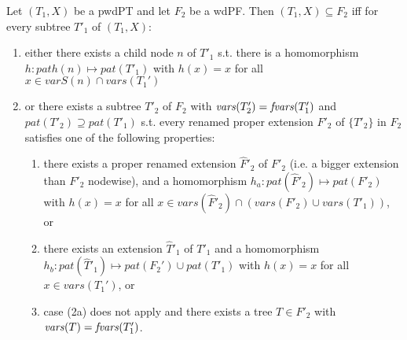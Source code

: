\begin{theorem}\label{projwd3}
	Let $(T_1,X)$ be a pwdPT and let $F_2$ be a wdPF. Then $(T_1,X) \subseteq
	F_2$ iff for every subtree $T'_1$ of $(T_1,X)$:
	\begin{enumerate}
		\item either there exists a child node $n$ of $T'_1$ s.t. there is a
			homomorphism $h: path(n) \mapsto pat(T'_1)$ with $h(x) = x$ for
			all $x \in varS(n) \cap vars(T_1')$
		\item or there exists a subtree $T'_2$ of $F_2$ with $\mathit{vars}(T'_2) =
			\mathit{fvars}(T_1')$ and $pat(T'_2) \supseteq pat(T'_1)$ s.t. every
			renamed proper extension $F'_2$ of $\{T'_2\}$ in $F_2$ satisfies one
			of the following properties:
			\begin{enumerate}
				\item \label{firstcaseprojwd3}there exists a proper renamed extension $\hat{F}'_2$ of
					$F'_2$ (i.e. a bigger extension than $F'_2$ nodewise),
					and a homomorphism $h_a: pat(\hat{F}'_2) \mapsto
					pat(F'_2)$ with $h(x) = x$ for all $x \in
					vars(\hat{F}'_2)\cap (vars(F'_2) \cup vars(T'_1))$, or
				\item there exists an extension $\hat{T}'_1$ of $T'_1$ and a
					homomorphism $h_b: pat(\hat{T}'_1) \mapsto pat(F_2') \cup
					pat(T'_1)$ with $h(x) =x$ for all $x \in vars(T_1')$, or
				\item case (2a) does not apply and there
					exists a tree $T \in F'_2$ with $\mathit{vars}(T)= \mathit{fvars}(T'_1)$.
			\end{enumerate}
	\end{enumerate}
\end{theorem}
